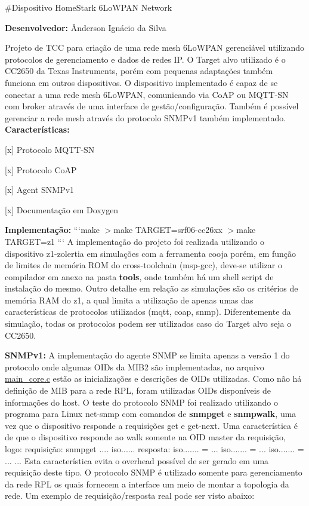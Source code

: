 \#\+Dispositivo Home\+Stark 6\+Lo\+W\+P\+A\+N Network 

{\bfseries Desenvolvedor\+:} Ânderson Ignácio da Silva

Projeto de T\+C\+C para criação de uma rede mesh 6\+Lo\+W\+P\+A\+N gerenciável utilizando protocolos de gerenciamento e dados de redes I\+P. O Target alvo utilizado é o C\+C2650 da Texas Instruments, porém com pequenas adaptações também funciona em outros dispositivos. O dispositivo implementado é capaz de se conectar a uma rede mesh 6\+Lo\+W\+P\+A\+N, comunicando via Co\+A\+P ou M\+Q\+T\+T-\/\+S\+N com broker através de uma interface de gestão/configuração. Também é possível gerenciar a rede mesh através do protocolo S\+N\+M\+Pv1 também implementado.  {\bfseries Características\+:}
\begin{DoxyItemize}
\item \mbox{[}x\mbox{]} Protocolo M\+Q\+T\+T-\/\+S\+N
\item \mbox{[}x\mbox{]} Protocolo Co\+A\+P
\item \mbox{[}x\mbox{]} Agent S\+N\+M\+Pv1
\item \mbox{[}x\mbox{]} Documentação em Doxygen
\end{DoxyItemize}

{\bfseries Implementação\+:} ```make $>$make T\+A\+R\+G\+E\+T=srf06-\/cc26xx $>$make T\+A\+R\+G\+E\+T=z1 ``` A implementação do projeto foi realizada utilizando o dispositivo z1-\/zolertia em simulações com a ferramenta cooja porém, em função de limites de memória R\+O\+M do cross-\/toolchain (msp-\/gcc), deve-\/se utilizar o compilador em anexo na pasta {\bfseries tools}, onde também há um shell script de instalação do mesmo. Outro detalhe em relação as simulações são os critérios de memória R\+A\+M do z1, a qual limita a utilização de apenas umas das características de protocolos utilizados (mqtt, coap, snmp). Diferentemente da simulação, todas os protocolos podem ser utilizados caso do Target alvo seja o C\+C2650.

{\bfseries S\+N\+M\+Pv1\+:} A implementação do agente S\+N\+M\+P se limita apenas a versão 1 do protocolo onde algumas O\+I\+Ds da M\+I\+B2 são implementadas, no arquivo \hyperlink{main__core_8c}{main\+\_\+core.\+c} estão as inicializações e descrições de O\+I\+Ds utilizadas. Como não há definição de M\+I\+B para a rede R\+P\+L, foram utilizadas O\+I\+Ds disponíveis de informações do host. O teste do protocolo S\+N\+M\+P foi realizado utilizando o programa para Linux net-\/snmp com comandos de {\bfseries snmpget} e {\bfseries snmpwalk}, uma vez que o dispositivo responde a requisições get e get-\/next. Uma característica é de que o dispositivo responde ao walk somente na O\+I\+D master da requisição, logo\+: requisição\+: snmpget .... iso...... resposta\+: iso....... = ... iso....... = ... iso....... = ... ... Esta característica evita o overhead possível de ser gerado em uma requisição deste tipo. O protocolo S\+N\+M\+P é utilizado somente para gerenciamento da rede R\+P\+L os quais fornecem a interface um meio de montar a topologia da rede. Um exemplo de requisição/resposta real pode ser visto abaixo\+: 

